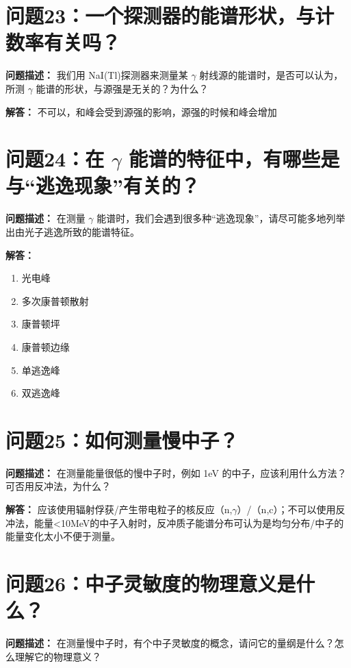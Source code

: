 \documentclass{article}
\begin{document}
\section{问题23：一个探测器的能谱形状，与计数率有关吗？}
\label{sec:prob23}

\textbf{问题描述：} 我们用 NaI(Tl)探测器来测量某 $\gamma$ 射线源的能谱时，是否可以认为，所测 $\gamma$ 能谱的形状，与源强是无关的？为什么？

\textbf{解答：} 不可以，和峰会受到源强的影响，源强的时候和峰会增加

\section{问题24：在 $\gamma$ 能谱的特征中，有哪些是与“逃逸现象”有关的？}
\label{sec:prob24}

\textbf{问题描述：} 在测量 $\gamma$ 能谱时，我们会遇到很多种“逃逸现象”，请尽可能多地列举出由光子逃逸所致的能谱特征。

\textbf{解答：}

\begin{enumerate}
    \item 光电峰
    \item 多次康普顿散射
    \item 康普顿坪
    \item 康普顿边缘
    \item 单逃逸峰
    \item 双逃逸峰
\end{enumerate}

\section{问题25：如何测量慢中子？}
\label{sec:prob25}

\textbf{问题描述：} 在测量能量很低的慢中子时，例如 1eV 的中子，应该利用什么方法？可否用反冲法，为什么？

\textbf{解答：} 应该使用辐射俘获/产生带电粒子的核反应（n,$\gamma$）/（n,c）；不可以使用反冲法，能量<10MeV的中子入射时，反冲质子能谱分布可认为是均匀分布/中子的能量变化太小不便于测量。

\section{问题26：中子灵敏度的物理意义是什么？}
\label{sec:prob26}

\textbf{问题描述：} 在测量慢中子时，有个中子灵敏度的概念，请问它的量纲是什么？怎么理解它的物理意义？
\end{document}
